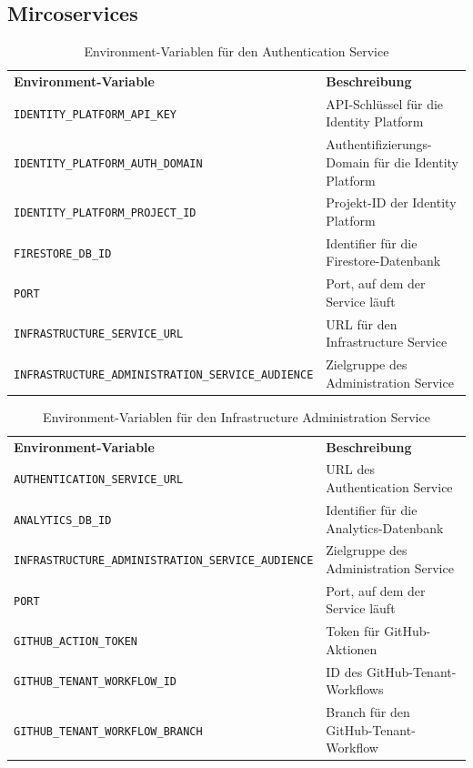 \subsection{Mircoservices}

{
\begin{longtable}{l p{6cm}}
  \caption{Environment-Variablen für den Authentication Service}
  \label{tab:auth-service-env-vars} \\
  \textbf{Environment-Variable} & \textbf{Beschreibung} \\ [1ex]
  \texttt{IDENTITY\_PLATFORM\_API\_KEY} & API-Schlüssel für die Identity Platform \\ [0.5ex]
  \texttt{IDENTITY\_PLATFORM\_AUTH\_DOMAIN} & Authentifizierungs-Domain für die Identity Platform \\ [0.5ex]
  \texttt{IDENTITY\_PLATFORM\_PROJECT\_ID} & Projekt-ID der Identity Platform \\ [0.5ex]
  \texttt{FIRESTORE\_DB\_ID} & Identifier für die Firestore-Datenbank \\ [0.5ex]
  \texttt{PORT} & Port, auf dem der Service läuft \\ [0.5ex]
  \texttt{INFRASTRUCTURE\_SERVICE\_URL} & URL für den Infrastructure Service \\ [0.5ex]
  \texttt{INFRASTRUCTURE\_ADMINISTRATION\_SERVICE\_AUDIENCE} & Zielgruppe des Administration Service \\ 
\end{longtable}}


{
\begin{longtable}{l p{6cm}}
  \caption{Environment-Variablen für den Infrastructure Administration Service}
  \label{tab:infra-admin-service-env-vars} \\
  \textbf{Environment-Variable} & \textbf{Beschreibung} \\ [1ex]
  \texttt{AUTHENTICATION\_SERVICE\_URL} & URL des Authentication Service \\ [0.5ex]
  \texttt{ANALYTICS\_DB\_ID} & Identifier für die Analytics-Datenbank \\ [0.5ex]
  \texttt{INFRASTRUCTURE\_ADMINISTRATION\_SERVICE\_AUDIENCE} & Zielgruppe des Administration Service \\ [0.5ex]
  \texttt{PORT} & Port, auf dem der Service läuft \\ [0.5ex]
  \texttt{GITHUB\_ACTION\_TOKEN} & Token für GitHub-Aktionen \\ [0.5ex]
  \texttt{GITHUB\_TENANT\_WORKFLOW\_ID} & ID des GitHub-Tenant-Workflows \\ [0.5ex]
  \texttt{GITHUB\_TENANT\_WORKFLOW\_BRANCH} & Branch für den GitHub-Tenant-Workflow \\ 
\end{longtable}}

